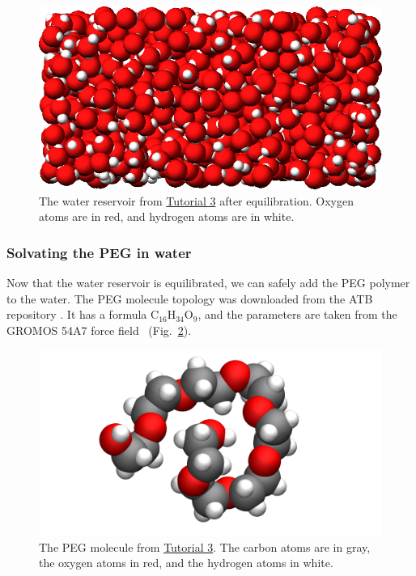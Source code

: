 \documentclass[9pt,tutorial]{livecoms}
\begin{document}
\begin{figure}
\centering
\includegraphics[width=\linewidth]{PEG-water}
\caption{The water reservoir from \hyperref[all-atom-label]{Tutorial 3}
after equilibration.  Oxygen atoms are in red, and hydrogen atoms are in white.}
\label{fig:PEG-water}
\end{figure}

\subsubsection{Solvating the PEG in water}

Now that the water reservoir is equilibrated, we can safely add the PEG polymer
to the water.  The PEG molecule topology was downloaded from the ATB repository
\cite{malde2011automated, oostenbrink2004biomolecular}.  It has a formula
$\text{C}_{16}\text{H}_{34}\text{O}_{9}$, and the parameters are taken from
the GROMOS 54A7 force field~\cite{schmid2011definition} (Fig.~\ref{fig:PEG-in-vacuum}).

\begin{figure}
\centering
\includegraphics[width=0.8\linewidth]{PEG-in-vacuum}
\caption{The PEG molecule from \hyperref[all-atom-label]{Tutorial 3}.
The carbon atoms are in gray, the oxygen atoms in red, and the hydrogen atoms in white.}
\label{fig:PEG-in-vacuum}
\end{figure}
\end{document}
